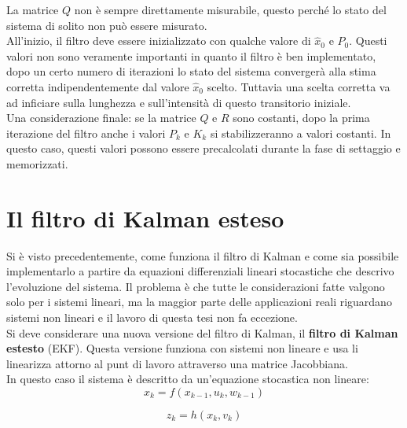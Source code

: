 La matrice $Q$ non è sempre direttamente misurabile, questo perché lo stato del sistema di solito non può essere misurato.\\
All'inizio, il filtro deve essere inizializzato con qualche valore di $\hat{x}_0$ e $P_0$. Questi valori non sono veramente importanti in quanto il filtro è ben implementato, dopo un certo numero di iterazioni lo stato del sistema convergerà alla stima corretta indipendentemente dal valore $\hat{x}_0$ scelto. Tuttavia una scelta corretta va ad inficiare sulla lunghezza e sull'intensità di questo transitorio iniziale.\\
Una considerazione finale: se la matrice $Q$ e $R$ sono costanti, dopo la prima iterazione del filtro anche i valori $P_k$ e $K_k$ si stabilizzeranno a valori costanti. In questo caso, questi valori possono essere precalcolati durante la fase di settaggio e memorizzati.

\section{Il filtro di Kalman esteso}
Si è visto precedentemente, come funziona il filtro di Kalman e come sia possibile implementarlo a partire da equazioni differenziali lineari stocastiche che descrivo l'evoluzione del sistema. Il problema è che tutte le considerazioni fatte valgono solo per i sistemi lineari, ma la maggior parte delle applicazioni reali riguardano sistemi non lineari e il lavoro di questa tesi non fa eccezione.\\
Si deve considerare una nuova versione del filtro di Kalman, il \textbf{filtro di Kalman estesto} (EKF). Questa versione funziona con sistemi non lineare e usa li linearizza attorno al punt di lavoro attraverso una matrice Jacobbiana.\\
In questo caso il sistema è descritto da un'equazione stocastica non lineare:
\begin{equation}
x_k = f(x_{k-1},u_k,w_{k-1})
\end{equation}

\begin{equation}
z_k = h(x_k,v_k)
\end{equation}

